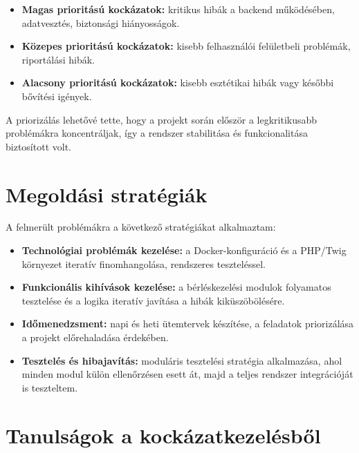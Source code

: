 \begin{itemize}
    \item \textbf{Magas prioritású kockázatok:} kritikus hibák a backend működésében, adatvesztés, biztonsági hiányosságok.
    \item \textbf{Közepes prioritású kockázatok:} kisebb felhasználói felületbeli problémák, riportálási hibák.
    \item \textbf{Alacsony prioritású kockázatok:} kisebb esztétikai hibák vagy későbbi bővítési igények.
\end{itemize}

A priorizálás lehetővé tette, hogy a projekt során először a legkritikusabb problémákra koncentráljak, 
így a rendszer stabilitása és funkcionalitása biztosított volt.

\section{Megoldási stratégiák}

A felmerült problémákra a következő stratégiákat alkalmaztam:
\begin{itemize}
    \item \textbf{Technológiai problémák kezelése:} a Docker-konfiguráció és a PHP/Twig környezet iteratív finomhangolása, rendszeres teszteléssel.
    \item \textbf{Funkcionális kihívások kezelése:} a bérléskezelési modulok folyamatos tesztelése és a logika iteratív javítása a hibák kiküszöbölésére.
    \item \textbf{Időmenedzsment:} napi és heti ütemtervek készítése, a feladatok priorizálása a projekt előrehaladása érdekében.
    \item \textbf{Tesztelés és hibajavítás:} moduláris tesztelési stratégia alkalmazása, ahol minden modul külön ellenőrzésen esett át, majd a teljes rendszer integrációját is teszteltem.
\end{itemize}

\section{Tanulságok a kockázatkezelésből}

